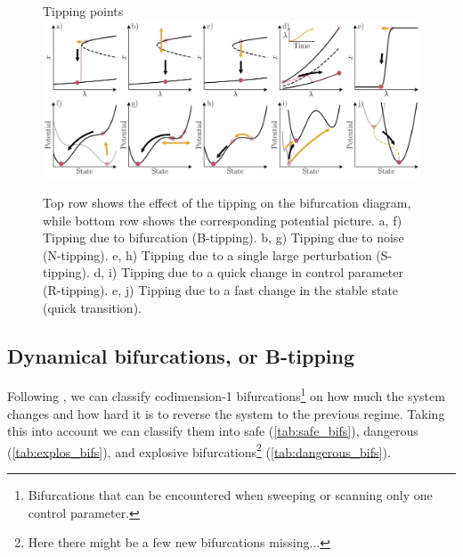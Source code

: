 \begin{figure}[htb]
	\centering
	Tipping points
	\hline
	\includegraphics[width=1\linewidth]{Images/Metrics/tippings}
	\caption{Top row shows the effect of the tipping on the bifurcation diagram, while bottom row shows the corresponding potential picture. a, f) Tipping due to bifurcation (B-tipping). b, g) Tipping due to  noise (N-tipping). e, h) Tipping due to a single large perturbation (S-tipping). d, i) Tipping due to a quick change in control parameter (R-tipping). e, j) Tipping due to a fast change in the stable state (quick transition). }
	\label{fig:largetippingsscheffer}
\end{figure}


\subsection{Dynamical bifurcations, or B-tipping}
Following \cite{Thompson2011a}, we can classify codimension-1 bifurcations\footnote{Bifurcations that can be encountered when sweeping or scanning only one control parameter.} on how much the system changes and how hard it is to reverse the system to the previous regime. 
Taking this into account we can  classify them into safe (\cref{tab:safe_bifs}), dangerous (\cref{tab:explos_bifs}), and explosive bifurcations\footnote{Here there might be a few new bifurcations missing...}  (\cref{tab:dangerous_bifs}).


